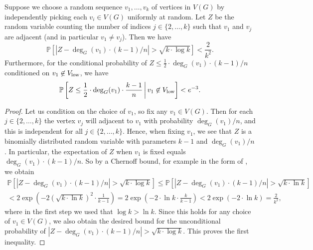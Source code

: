 \begin{lemma}\label{lemma-Chernoff-sequence-G} Suppose we choose a random sequence $v_1,\dots,v_k$ of vertices in $V(G)$ by independently picking each $v_i\in V(G)$ uniformly at random. Let $Z$ be the random variable counting the number of indices $j\in \lbrace 2,\dots,k\rbrace$ such that $v_1$ and $v_j$ are adjacent (and in particular $v_1\neq v_j$). Then we have
\[\mathbb{P}\left[\left\vert Z-\deg_G(v_1)\cdot (k-1)/n\right\vert> \sqrt{k\cdot \log k}\right]<\frac{2}{k^2}.\]
Furthermore, for the conditional probability of $Z\leq \frac{1}{2}\cdot \deg_G(v_1)\cdot (k-1)/n$ conditioned on $v_1\not\in V_{\textnormal{low}}$, we have
\[\mathbb{P}\left[ Z\leq \frac{1}{2}\cdot \deg_G(v_1)\cdot \frac{k-1}{n}\,\bigg\vert\, v_1\not\in V_{\textnormal{low}}\right]<e^{-3}.\]
\end{lemma}
\begin{proof}Let us condition on the choice of $v_1$, so fix any $v_1\in V(G)$. Then for each $j\in \lbrace 2,\dots,k\rbrace$ the vertex $v_j$ will adjacent to $v_1$ with probability $\deg_G(v_1)/n$, and this is independent for all $j\in \lbrace 2,\dots,k\rbrace$. Hence, when fixing $v_1$, we see that $Z$ is a binomially distributed random variable with parameters $k-1$ and $\deg_G(v_1)/n$. In particular, the expectation of $Z$ when $v_1$ is fixed equals $\deg_G(v_1)\cdot (k-1)/n$. So by a Chernoff bound, for example in the form of \cite[Corollary A.1.7]{alon-spencer}, we obtain
\begin{multline*}
\mathbb{P}\left[\left\vert Z-\deg_G(v_1)\cdot (k-1)/n\right\vert> \sqrt{k\cdot \log k}\right]\leq \mathbb{P}\left[\left\vert Z-\deg_G(v_1)\cdot (k-1)/n\right\vert> \sqrt{k\cdot \ln k}\right]\\
<2\exp\left(-2\left(\sqrt{k\cdot \ln k}\right)^2\cdot \frac{1}{k-1}\right)=2\exp\left(-2\cdot \ln k\cdot \frac{k}{k-1}\right)<2\exp\left(-2\cdot \ln k\right)=\frac{2}{k^2},
\end{multline*}
where in the first step we used that $\log k>\ln k$. Since this holds for any choice of $v_1\in V(G)$, we also obtain the desired bound for the unconditional probability of $\left\vert Z-\deg_G(v_1)\cdot (k-1)/n\right\vert> \sqrt{k\cdot \log k}$. This proves the first inequality.


\end{proof}
